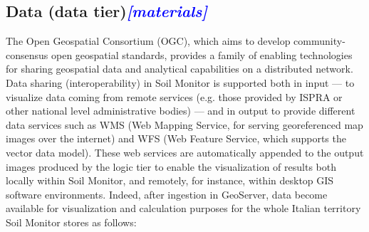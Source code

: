 \documentclass[APA,LATO1COL,doublespace]{WileyNJD-v2}
\newcommand{\update}[1]{\emph{\textcolor{blue}{#1}}}     %
\begin{document}
\subsection{Data (data tier)\update{[materials]}}\label{sec:dataTier}
The Open Geospatial Consortium (OGC), which aims to develop community-consensus open geospatial standards, provides a family of enabling technologies for sharing geospatial data and analytical capabilities on a distributed network. 
Data sharing (interoperability) in Soil Monitor is supported both in input --- to visualize data coming from remote services (e.g. those provided by ISPRA or other national level administrative bodies) --- and in output to provide different data services such as WMS (Web Mapping Service, for serving georeferenced map images over the internet) and WFS (Web Feature Service, which supports the vector data model). %
These web services are automatically appended to the output images produced by the logic tier %
to enable the visualization of results both locally within Soil Monitor, and remotely, for instance, within desktop GIS software environments.
Indeed, after ingestion in GeoServer, data become available for visualization and calculation purposes for the whole Italian territory Soil Monitor stores as follows:
\end{document}

